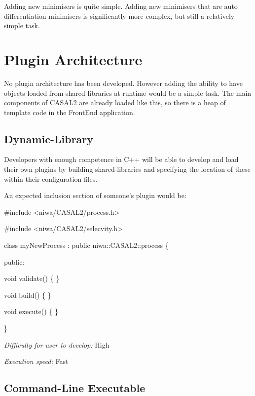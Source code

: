 \documentclass[a4paper,11pt,twoside,pdftex,draft]{article}
\begin{document}
Adding new minimisers is quite simple. Adding new minimisers that are
auto differentiation minimisers is significantly more complex, but still
a relatively simple task.

\hypertarget{section}{%
\section{\texorpdfstring{\hfill\break
}{ }}\label{section}}

\hypertarget{plugin-architecture}{%
\section{Plugin Architecture}\label{plugin-architecture}}

No plugin architecture has been developed. However adding the ability to
have objects loaded from shared libraries at runtime would be a simple
task. The main components of CASAL2 are already loaded like this, so
there is a heap of template code in the FrontEnd application.

\hypertarget{dynamic-library}{%
\subsection{Dynamic-Library}\label{dynamic-library}}

Developers with enough competence in C++ will be able to develop and
load their own plugins by building shared-libraries and specifying the
location of these within their configuration files.

An expected inclusion section of someone's plugin would be:

\#include \textless niwa/CASAL2/process.h\textgreater{}

\#include \textless niwa/CASAL2/selecvity.h\textgreater{}

class myNewProcess : public niwa::CASAL2::process \{

public:

void validate() \{ \}

void build() \{ \}

void execute() \{ \}

\}

\emph{Difficulty for user to develop:} High

\emph{Execution speed:} Fast

\hypertarget{command-line-executable}{%
\subsection{Command-Line Executable}\label{command-line-executable}}
\end{document}
